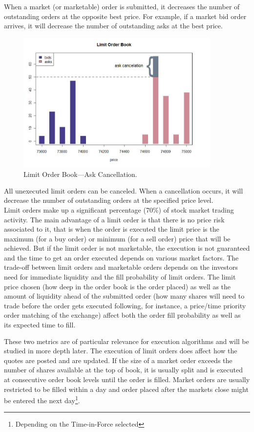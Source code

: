 When a market (or marketable) order is submitted, it decreases the number of outstanding orders at the opposite best price. For example, if a market bid order arrives, it will decrease the number of outstanding asks at the best price.
	\begin{figure}[!ht]
	   \centering
	   \includegraphics[width=0.9\textwidth]{chapters/chapter_trading_fund/figures/limitbk3.png} 
	   \caption{Limit Order Book---Ask Cancellation. \label{fig:limbk3}}
	\end{figure}
All unexecuted limit orders can be canceled. When a cancellation occurs, it will decrease the number of outstanding orders at the specified price level. \\


Limit orders make up a significant percentage (70\%) of stock market trading activity. The main advantage of a limit order is that there is no price risk associated to it, that is when the order is executed the limit price is the maximum (for a buy order) or minimum (for a sell order) price that will be achieved. But if the limit order is not marketable, the execution is not guaranteed and the time to get an order executed depends on various market factors. The trade-off between limit orders and marketable orders depends on the investors need for immediate liquidity and the fill probability of limit orders. The limit price chosen (how deep in the order book is the order placed) as well as the amount of liquidity ahead of the submitted order (how many shares will need to trade before the order gets executed following, for instance, a price/time priority order matching of the exchange) affect both the order fill probability as well as its expected time to fill. 

These two metrics are of particular relevance for execution algorithms and will be studied in more depth later. The execution of limit orders does affect how the quotes are posted and are updated. If the size of a market order exceeds the number of shares available at the top of book, it is usually split and is executed at consecutive order book levels until the order is filled. Market orders are usually restricted to be filled within a day and order placed after the markets close might be entered the next day\footnote{Depending on the Time-in-Force selected}.  \\


